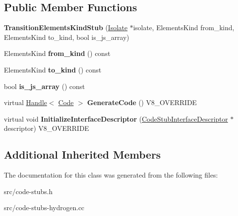\subsection*{Public Member Functions}
\begin{DoxyCompactItemize}
\item 
\hypertarget{classv8_1_1internal_1_1_transition_elements_kind_stub_afb9b2f6dcdfec61b5cf9078a5680b7c7}{}{\bfseries Transition\+Elements\+Kind\+Stub} (\hyperlink{classv8_1_1internal_1_1_isolate}{Isolate} $\ast$isolate, Elements\+Kind from\+\_\+kind, Elements\+Kind to\+\_\+kind, bool is\+\_\+js\+\_\+array)\label{classv8_1_1internal_1_1_transition_elements_kind_stub_afb9b2f6dcdfec61b5cf9078a5680b7c7}

\item 
\hypertarget{classv8_1_1internal_1_1_transition_elements_kind_stub_a2683c6a10b54a37563dd27eb36acb6fe}{}Elements\+Kind {\bfseries from\+\_\+kind} () const \label{classv8_1_1internal_1_1_transition_elements_kind_stub_a2683c6a10b54a37563dd27eb36acb6fe}

\item 
\hypertarget{classv8_1_1internal_1_1_transition_elements_kind_stub_ad63378af89698f65e013c16f976fcdd3}{}Elements\+Kind {\bfseries to\+\_\+kind} () const \label{classv8_1_1internal_1_1_transition_elements_kind_stub_ad63378af89698f65e013c16f976fcdd3}

\item 
\hypertarget{classv8_1_1internal_1_1_transition_elements_kind_stub_aa4734b5a0a96867b3ca289fd38bf9ea7}{}bool {\bfseries is\+\_\+js\+\_\+array} () const \label{classv8_1_1internal_1_1_transition_elements_kind_stub_aa4734b5a0a96867b3ca289fd38bf9ea7}

\item 
\hypertarget{classv8_1_1internal_1_1_transition_elements_kind_stub_ac230297be1e47afef118607ffb940fb7}{}virtual \hyperlink{classv8_1_1internal_1_1_handle}{Handle}$<$ \hyperlink{classv8_1_1internal_1_1_code}{Code} $>$ {\bfseries Generate\+Code} () V8\+\_\+\+O\+V\+E\+R\+R\+I\+D\+E\label{classv8_1_1internal_1_1_transition_elements_kind_stub_ac230297be1e47afef118607ffb940fb7}

\item 
\hypertarget{classv8_1_1internal_1_1_transition_elements_kind_stub_a62a49b48ae15f996d6c8c73da0b8eccc}{}virtual void {\bfseries Initialize\+Interface\+Descriptor} (\hyperlink{classv8_1_1internal_1_1_code_stub_interface_descriptor}{Code\+Stub\+Interface\+Descriptor} $\ast$descriptor) V8\+\_\+\+O\+V\+E\+R\+R\+I\+D\+E\label{classv8_1_1internal_1_1_transition_elements_kind_stub_a62a49b48ae15f996d6c8c73da0b8eccc}

\end{DoxyCompactItemize}
\subsection*{Additional Inherited Members}


The documentation for this class was generated from the following files\+:\begin{DoxyCompactItemize}
\item 
src/code-\/stubs.\+h\item 
src/code-\/stubs-\/hydrogen.\+cc\end{DoxyCompactItemize}
